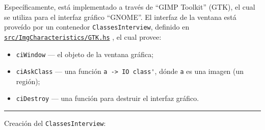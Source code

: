 \documentclass{article}
\newcommand{\crule}[2][1pt]
    {\begin{center}\rule{#2\textwidth}{#1}\end{center}}
\newcommand\refcode[2]{ \href{#1}{\texttt{#2}} }
\begin{document}
Específicamente, está implementado a través de ``GIMP Toolkit'' (GTK), el cual se utiliza para el interfaz gráfico ``GNOME''. El interfaz de la ventana está proveído por un contenedor \verb|ClassesInterview|, definido en \\ \refcode{\GTK}{src/ImgCharacteristics/GTK.hs}, el cual provee:
\begin{itemize}
    \item \verb|ciWindow| --- el objeto de la ventana gráfica;
    \item \verb|ciAskClass| --- una función \verb|a -> IO class'|, dónde \verb|a| es una 
                                imagen (un región);
    \item \verb|ciDestroy| --- una función para destruir el interfaz gráfico.
\end{itemize}

\crule{1}
\medskip
Creación del \verb|ClassesInterview|:
\medskip

\end{document}
